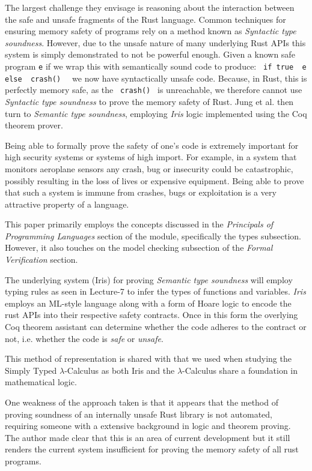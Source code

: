 \documentclass[11pt]{article}
\begin{document}
The largest challenge they envisage is reasoning about the interaction between the safe and unsafe fragments of the Rust language. Common techniques for ensuring memory safety of programs rely on a method known as \textit{Syntactic type soundness}. However, due to the unsafe nature of many underlying Rust APIs this system is simply demonstrated to not be powerful enough. Given a known safe program \texttt{e} if we wrap this with semantically sound code to produce: \texttt{ if true { e } else { crash() } } we now have syntactically unsafe code. Because, in Rust, this is perfectly memory safe, as the \texttt{ crash() } is unreachable, we therefore cannot use \textit{Syntactic type soundness} to prove the memory safety of Rust. Jung et al. then turn to \textit{Semantic type soundness}, employing \textit{Iris} logic implemented using the Coq theorem prover.

Being able to formally prove the safety of one's code is extremely important for high security systems or systems of high import. For example, in a system that monitors aeroplane sensors any crash, bug or insecurity could be catastrophic, possibly resulting in the loss of lives or expensive equipment. Being able to prove that such a system is immune from crashes, bugs or exploitation is a very attractive property of a language.

This paper primarily employs the concepts discussed in the \textit{Principals of Programming Languages} section of the module, specifically the types subsection. However, it also touches on the model checking subsection of the \textit{Formal Verification} section.

The underlying system (Iris) for proving \textit{Semantic type soundness} will employ typing rules as seen in Lecture-7 to infer the types of functions and variables. \textit{Iris} employs an ML-style language along with a form of Hoare logic to encode the rust APIs into their respective safety contracts. Once in this form the overlying Coq theorem assistant can determine whether the code adheres to the contract or not, i.e. whether the code is \textit{safe} or \textit{unsafe}. 

This method of representation is shared with that we used when studying the Simply Typed $\lambda$-Calculus as both Iris and the $\lambda$-Calculus share a foundation in mathematical logic. 

One weakness of the approach taken is that it appears that the method of proving soundness of an internally unsafe Rust library is not automated, requiring someone with a extensive background in logic and theorem proving. The author made clear that this is an area of current development but it still renders the current system insufficient for proving the memory safety of all rust programs.
\end{document}
